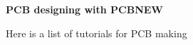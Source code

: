 \documentclass[16pt]{article}
\begin{document}
{\textbf{PCB designing with
PCBNEW}}

Here is a list of tutorials for PCB making


\end{document}
